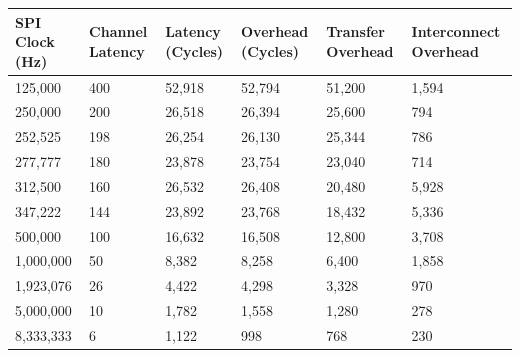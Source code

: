 \begin{table}
    \centering
    \begin{threeparttable}
    \begin{tabular}{l|l|l|l|l|l}
    \textbf{SPI Clock (Hz)} & \textbf{Channel Latency} & \textbf{Latency (Cycles)} & \textbf{Overhead (Cycles)} & \textbf{Transfer Overhead} & \textbf{Interconnect Overhead} \\ \hline
     125,000               &  400                 &  52,918              &  52,794              & 51,200                &  1,594                                      \\
     250,000               &  200                 &  26,518              &  26,394              & 25,600                &  794                                        \\
     252,525\tnote{*}      &  198                 &  26,254              &  26,130              & 25,344                &  786                                        \\
     277,777\tnote{*}      &  180                 &  23,878              &  23,754              & 23,040                &  714                                        \\
     312,500               &  160                 &  26,532              &  26,408              & 20,480                &  5,928                                      \\
     347,222\tnote{*}      &  144                 &  23,892              &  23,768              & 18,432                &  5,336                                      \\
     500,000               &  100                 &  16,632              &  16,508              & 12,800                &  3,708                                      \\
     1,000,000             &  50                  &  8,382               &  8,258               & 6,400                 &  1,858                                      \\
     1,923,076\tnote{*}    &  26                  &  4,422               &  4,298               & 3,328                 &  970                                        \\
     5,000,000             &  10                  &  1,782               &  1,558               & 1,280                 &  278                                        \\
     8,333,333\tnote{*}    &  6                   &  1,122               &  998                 & 768                   &  230                                        \\

\end{tabular}
\end{threeparttable}
\end{table}
